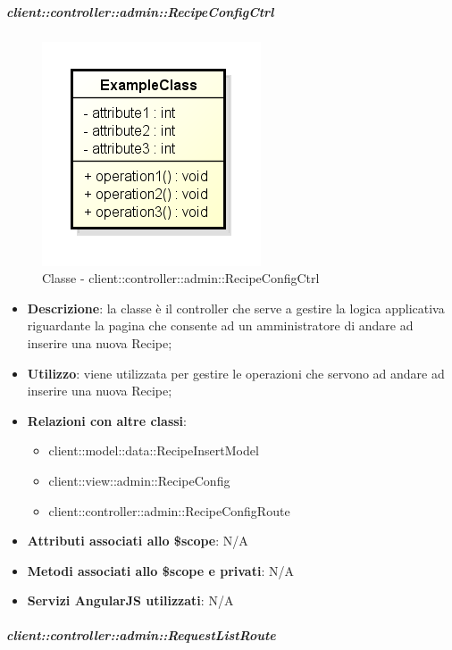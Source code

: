 		\subparagraph{client::controller::admin::RecipeConfigCtrl} %
		\label{subp:bdsm_app_client_controller_admin_recipeconfigctrl}
			\begin{figure}[htbp]
				\centering
				\centerline{\includegraphics[scale=0.7]{./images/client/classes/example_class.png}}
				\caption{Classe - client::controller::admin::RecipeConfigCtrl}
			\end{figure}
			\begin{itemize}
				\item \textbf{Descrizione}: la classe è il controller che serve a gestire la logica applicativa riguardante la pagina che consente ad un amministratore di andare ad inserire una nuova Recipe;
				\item \textbf{Utilizzo}: viene utilizzata per gestire le operazioni che servono ad andare ad inserire una nuova Recipe;
				\item \textbf{Relazioni con altre classi}:
					\begin{itemize}
						\item client::model::data::RecipeInsertModel
						\item client::view::admin::RecipeConfig
						\item client::controller::admin::RecipeConfigRoute
					\end{itemize}

				\item \textbf{Attributi associati allo \$scope}: N/A
				\item \textbf{Metodi associati allo \$scope e privati}: N/A
				\item \textbf{Servizi AngularJS utilizzati}: N/A

			\end{itemize}

		\subparagraph{client::controller::admin::RequestListRoute} %
		\label{subp:bdsm_app_client_controller_admin_recipelistroute}

